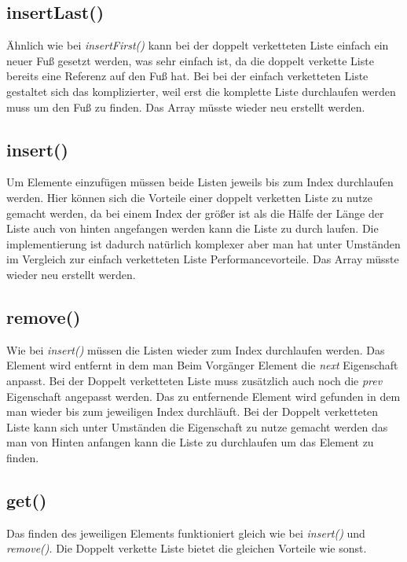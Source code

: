 \documentclass[a4paper, 11pt]{article}
\begin{document}
\subsection*{insertLast()}

Ähnlich wie bei \textit{insertFirst()} kann bei der doppelt verketteten Liste einfach ein neuer Fuß gesetzt werden, was
sehr einfach ist, da die doppelt verkette Liste bereits eine Referenz auf den Fuß hat. Bei bei der einfach verketteten
Liste gestaltet sich das komplizierter, weil erst die komplette Liste durchlaufen werden muss um den Fuß zu finden.
Das Array müsste wieder neu erstellt werden.

\subsection*{insert()}

Um Elemente einzufügen müssen beide Listen jeweils bis zum Index durchlaufen werden. Hier können sich die Vorteile einer
doppelt verketten Liste zu nutze gemacht werden, da bei einem Index der größer ist als die Hälfe der Länge der Liste auch
von hinten angefangen werden kann die Liste zu durch laufen. Die implementierung ist dadurch natürlich komplexer aber
man hat unter Umständen im Vergleich zur einfach verketteten Liste Performancevorteile. Das Array müsste wieder neu
erstellt werden.


\subsection*{remove()}
Wie bei \textit{insert()} müssen die Listen wieder zum Index durchlaufen werden. Das Element wird entfernt in dem man
Beim Vorgänger Element die \textit{next} Eigenschaft anpasst. Bei der Doppelt verketteten Liste muss zusätzlich auch
noch die \textit{prev} Eigenschaft angepasst werden. Das zu entfernende Element wird gefunden in dem man wieder bis zum
jeweiligen Index durchläuft. Bei der Doppelt verketteten Liste kann sich unter Umständen die Eigenschaft zu nutze
gemacht werden das man von Hinten anfangen kann die Liste zu durchlaufen um das Element zu finden.

\subsection*{get()}
Das finden des jeweiligen Elements funktioniert gleich wie bei \textit{insert()} und \textit{remove()}.
Die Doppelt verkette Liste bietet die gleichen Vorteile wie sonst.
\end{document}
